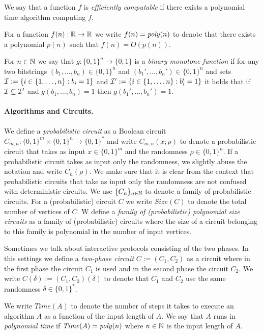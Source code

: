 We say that a function $f$ is \textit{efficiently computable} if there exists a polynomial time algorithm computing $f$.

For a function $f(n): \mathbb{R} \rightarrow \mathbb{R}$ we write $f(n) = \operatorname{\mathit{poly}}(n)$ to denote that there exists a polynomial $p(n)$
such that $f(n) = O(p(n))$.

\begin{definition}
For $n \in \mathbb{N}$ we say that $g: \{0,1\}^n \rightarrow \{0,1\}$ is a \textit{binary monotone function}
if for any two bitstrings $(b_1, \dotsc, b_n) \in \{0,1\}^{n}$ and $(b_1', \dotsc, b_n') \in \{0,1\}^{n}$
and sets $\mathcal{I} := \{i \in \{1,\dotsc, n\}: b_i = 1\}$ and $\mathcal{I}' := \{i \in \{1,\dotsc, n\} : b_i' = 1\}$ it holds
that if $\mathcal{I} \subseteq \mathcal{I}'$ and $g(b_1, \dotsc, b_n) = 1$ then $g(b_1', \dotsc, b_n') = 1$.
\end{definition}

\paragraph{Algorithms and Circuits.}
We define a \textit{probabilistic circuit} as a Boolean circuit $C_{m,n} : \{0,1\}^{m} \times \{0,1\}^{n} \rightarrow \{0,1\}^{*}$ and
write $C_{m,n}(x;\rho)$ to denote a probabilistic circuit that takes as input $x \in \{0,1\}^{m}$ and the randomness $\rho \in \{0,1\}^{n}$.
If a probabilistic circuit takes as input only the randomness, we slightly abuse the notation and write $C_{n}(\rho)$.
We make sure that it is clear from the context that probabilistic circuits that take as input only the randomness
are not confused with deterministic circuits. We use $\{C_n\}_{n \in \mathbb{N}}$ to denote a family of probabilistic circuits.
For a (probabilistic) circuit $C$ we write $\mathit{Size}(C)$ to denote the total number of vertices of $C$.
W define a \textit{family of (probabilistic) polynomial size circuits} as a family of (probabilistic) circuits where
the size of a circuit belonging to this family is polynomial in the number of input vertices.

Sometimes we talk about interactive protocols consisting of the two phases.
In this settings we define a \textit{two-phase circuit} $C := (C_1, C_2)$ as a circuit
where in the first phase the circuit $C_1$ is used and in the second phase the circuit $C_2$.
We write $C(\delta) := (C_1, C_2)(\delta)$ to denote that $C_1$ and $C_2$ use the same randomness $\delta \in \{0,1\}^{*}$.

We write $\mathit{Time}(A)$ to denote the number of steps it takes to execute
an algorithm $A$ as a function of the input length of $A$.
We say that $A$ runs in \textit{polynomial time} if $\operatorname{\mathit{Time}}(A) = \operatorname{\mathit{poly}}(n)$ where $n \in \mathbb{N}$ is the input length of $A$.

